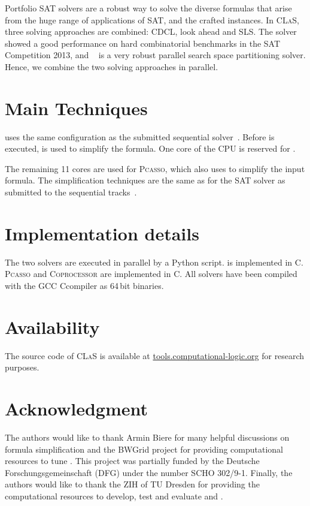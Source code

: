 \documentclass[conference]{IEEEtran}
\def\CC{{C\nolinebreak[4]\hspace{-.05em}\raisebox{.4ex}{\tiny\bf ++}}}
\begin{document}
Portfolio SAT solvers are a robust way to solve the diverse formulas that arise from the huge range of applications of SAT, and the crafted instances. 
In \textsc{CLaS}, three solving approaches are combined: CDCL, look ahead and SLS. 
The solver \scp~\cite{SparrowToRiss} showed a good performance on hard combinatorial benchmarks in the SAT Competition 2013, and \pcasso~\cite{Pcasso2014} is a very robust parallel search space partitioning solver. 
Hence, we combine the two solving approaches in parallel. 

\section{Main Techniques}

\scp uses the same configuration as the submitted sequential solver~\cite{SparrowCP2014}. 
Before \sparrow is executed, \cp is used to simplify the formula. 
One core of the CPU is reserved for \scp.

The remaining 11 cores are used for \textsc{Pcasso}, which also uses \cp to simplify the input formula. 
The simplification techniques are the same as for the SAT solver \riss as submitted to the sequential tracks~\cite{riss427}. 


\section{Implementation details}

The two solvers are executed in parallel by a Python script. 
\sparrow is implemented in C.
%
\textsc{Pcasso} and \textsc{Coprocessor} are implemented in \CC. 
%
All solvers have been compiled with the GCC \CC compiler as  64\,bit binaries.

\newpage

\section{Availability}

The source code of \textsc{CLaS} is available at \url{tools.computational-logic.org} for research purposes. 

\section*{Acknowledgment}
The authors would like to thank Armin Biere for many helpful discussions on formula simplification and the BWGrid \cite{bwgrid} project for providing computational resources to tune \cp. 
This project was partially funded by the Deutsche Forschungsgemeinschaft (DFG) under the number SCHO 302/9-1.
Finally, the authors would like to thank the ZIH of TU Dresden for providing the computational resources to develop, test and evaluate \clas and \pcasso.




\end{document}
